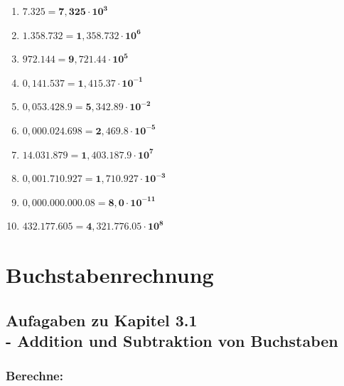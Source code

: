 \documentclass[a4paper,10pt]{article} %
\begin{document}
\begin{enumerate}[label=\alph*)]

  \item \(7.325 =
    \mathbf{7,325 \cdot 10^3}\) %

  \item \(1.358.732 =
    \mathbf{1,358.732 \cdot 10^6}\) %

  \item \(972.144 =
    \mathbf{9,721.44 \cdot 10^5}\) %

  \item \(0,141.537 =
    \mathbf{1,415.37 \cdot 10^{-1}}\) %

  \item \(0,053.428.9 =
    \mathbf{5,342.89 \cdot 10^{-2}}\) %

  \item \(0,000.024.698 =
    \mathbf{2,469.8 \cdot 10^{-5}}\) %

  \item \(14.031.879 =
    \mathbf{1,403.187.9 \cdot 10^7}\) %

  \item \(0,001.710.927 =
    \mathbf{1,710.927 \cdot 10^{-3}}\) %

  \item \(0,000.000.000.08 =
    \mathbf{8,0 \cdot 10^{-11}}\) %

  \item \(432.177.605 =
    \mathbf{4,321.776.05 \cdot 10^8}\) %

\end{enumerate}

\section{Buchstabenrechnung}

\subsection{Aufagaben zu Kapitel 3.1 \\
  - Addition und Subtraktion von Buchstaben}

\subsubsection{Berechne:} %
\end{document}
